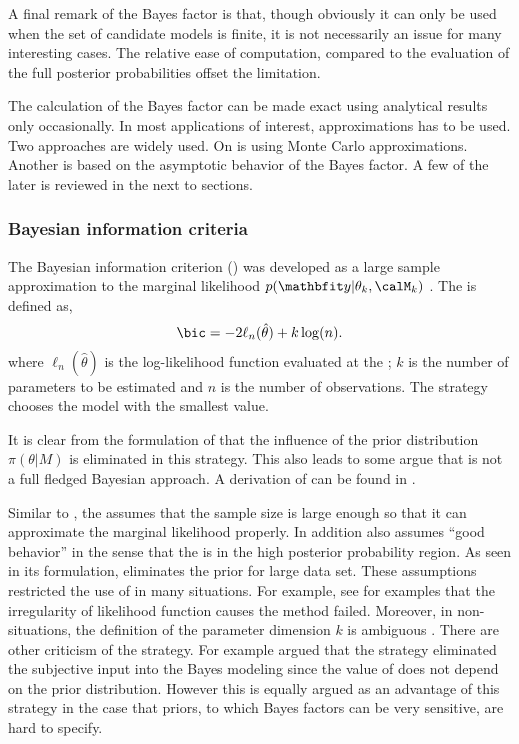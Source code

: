A final remark of the Bayes factor is that, though obviously it can only be
used when the set of candidate models is finite, it is not necessarily
an issue for many interesting cases. The relative ease of computation,
compared to the evaluation of the full posterior probabilities offset the
limitation.



The calculation of the Bayes factor can be made exact using analytical results
only occasionally. In most applications of interest, approximations has to be
used. Two approaches are widely used. On is using Monte Carlo approximations.
Another is based on the asymptotic behavior of the Bayes factor. A few of the
later is reviewed in the next to sections.

\subsubsection{Bayesian information criteria}
\label{ssub:Bayesian information criteria}

The Bayesian information criterion (\bic) was developed as a large sample
approximation to the marginal likelihood $p(\data|\theta_k,\calM_k)$
\cite{Schwarz:1978uv}. The \bic is defined as,
\begin{equation}
  \text{\bic} = -2\ell_n(\hat\theta) + k\log(n).
  \label{eq:bic}
\end{equation}
where $\ell_n(\hat\theta)$ is the log-likelihood function evaluated at the
\mle; $k$ is the number of parameters to be estimated and $n$ is the number of
observations. The \bic strategy chooses the model with the smallest \bic
value.

It is clear from the formulation of \bic that the influence of the prior
distribution $\pi(\theta|M)$ is eliminated in this strategy. This also leads
to some argue that \bic is not a full fledged Bayesian approach. A derivation
of \bic can be found in \cite[][sec.~3.2]{Claeskens:2008tq}.

Similar to \aic, the \bic assumes that the sample size is large enough so that
it can approximate the marginal likelihood properly. In addition \bic also
assumes ``good behavior'' in the sense that the \mle is in the high posterior
probability region. As seen in its formulation, \bic eliminates the prior for
large data set. These assumptions restricted the use of \bic in many
situations. For example, see \cite{Berger:2001uy} for examples that the
irregularity of likelihood function causes the \bic method failed. Moreover,
in non-\iid situations, the definition of the parameter dimension $k$ is
ambiguous \cite{Spiegelhalter:1998uc, Kass:1995vb}. There are other criticism
of the \bic strategy. For example \cite[][sec.~7.2.3]{Robert:2007tc} argued
that the \bic strategy eliminated the subjective input into the Bayes modeling
since the value of \bic does not depend on the prior distribution. However
this is equally argued as an advantage of this strategy in the case that
priors, to which Bayes factors can be very sensitive, are hard to specify.


